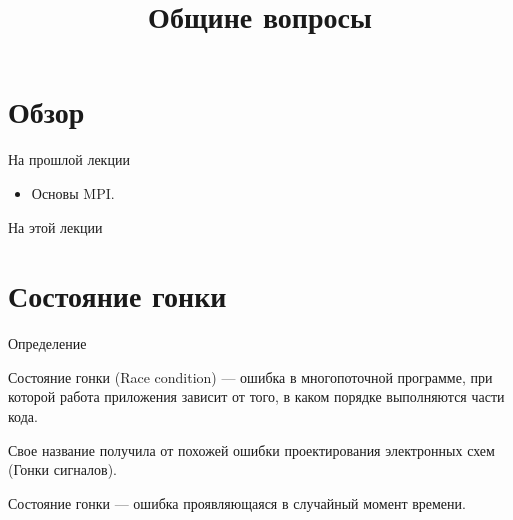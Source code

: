 

\title{Общине вопросы}



\begin{frame}
\titlepage
\end{frame}

\section*{Обзор}

\begin{frame}{На прошлой лекции}

\begin{itemize}
    \item Основы MPI.
\end{itemize}

\end{frame}

\begin{frame}{На этой лекции}
\tableofcontents
\end{frame} 


\section{Состояние гонки}

\begin{frame}{Определение}

Состояние гонки (\abbr Race condition) --- ошибка в многопоточной программе, при которой работа приложения зависит от того, в каком порядке выполняются части кода.

Свое название получила от похожей ошибки проектирования электронных схем (Гонки сигналов).

Состояние гонки --- ошибка проявляющаяся в случайный момент времени.

\end{frame}

